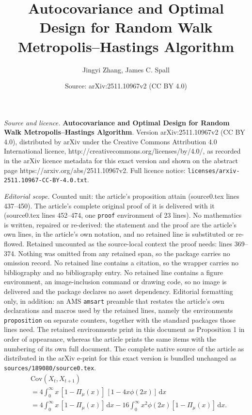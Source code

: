 \documentclass[10pt,a4paper]{amsart}
\title{\LARGE \textbf{Autocovariance and Optimal Design for Random Walk Metropolis--Hastings Algorithm}}
\author{Jingyi Zhang, James C. Spall}
\date{Source: arXiv:2511.10967v2 (CC BY 4.0)}
\newcommand{\df}{\mathrm{d}}
\begin{document}
\maketitle

\noindent\emph{Source and licence.} \LARGE \textbf{Autocovariance and Optimal Design for Random Walk Metropolis--Hastings Algorithm}. Version arXiv:2511.10967v2 (CC BY 4.0), distributed by arXiv under the Creative Commons Attribution 4.0 International licence, http://creativecommons.org/licenses/by/4.0/, as recorded in the arXiv licence metadata for this exact version and shown on the abstract page https://arxiv.org/abs/2511.10967v2. Full licence notice: \texttt{licenses/arxiv-2511.10967-CC-BY-4.0.txt}.\par\smallskip

\noindent\textit{Editorial scope.} Counted unit: the article's proposition attain (source0.tex lines 437--450). The article's complete original proof of it is delivered with it (source0.tex lines 452--474, one \texttt{proof} environment of 23 lines). No mathematics is written, repaired or re-derived: the statement and the proof are the article's own lines, in the article's own notation, and no retained line is substituted or re-flowed.  Retained uncounted as the source-local context the proof needs: lines 369--374.  Nothing was omitted from any retained span, so the package carries no omission record.  No retained line contains a citation, so the wrapper carries no bibliography and no bibliography entry.  No retained line contains a figure environment, an image-inclusion command or drawing code, so no image is delivered and the package declares no asset dependency.  Editorial formatting only, in addition: an AMS \texttt{amsart} preamble that restates the article's own declarations and macros used by the retained lines, namely the environments \texttt{proposition} on separate counters, together with the standard packages those lines need.  The retained environments print in this document as Proposition 1 in order of appearance, whereas the article prints the same items with the numbering of its own full document.  The complete native source of the article as distributed in the arXiv e-print for this exact version is bundled unchanged as \texttt{sources/189080/source0.tex}.
\begin{align}\label{recall prop}
&\mathrm{Cov}(X_t,X_{t+1})\nonumber\nonumber\\
&= 4 \int_0^\infty x \,[1-\Pi_\mu(x)]\,[1-4x\phi(2x)]\,\df x \nonumber\\
&= 4 \int_0^\infty x \,[1-\Pi_\mu(x)]\,\df x
   - 16 \int_0^\infty x^2 \phi(2x)[1-\Pi_\mu(x)]\,\df x.
\end{align}
\end{document}
